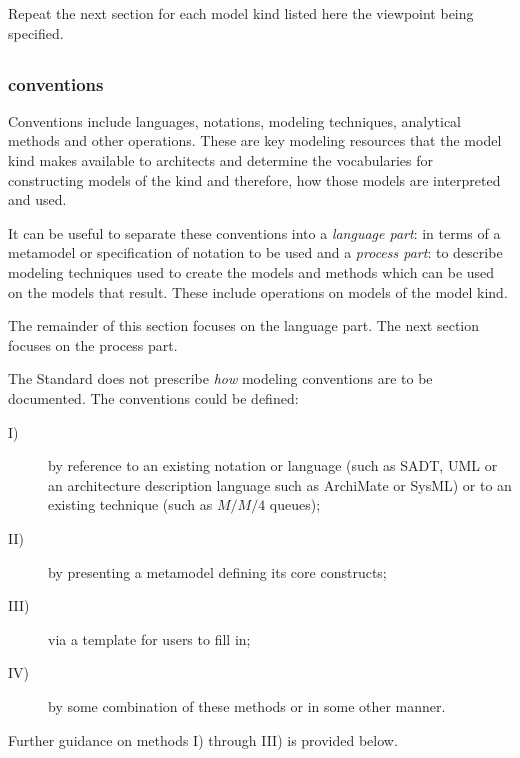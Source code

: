 Repeat the next section for each model kind listed here the viewpoint
being specified.


\subsection{}\label{vp:mk}



\subsubsection{ conventions} 


Conventions include languages, notations, modeling techniques,
analytical methods and other operations. These are key modeling
resources that the model kind makes available to architects and
determine the vocabularies for constructing models of the kind and
therefore, how those models are interpreted and used.

It can be useful to separate these conventions into a \emph{language
  part}: in terms of a metamodel or specification of notation to be
used and a \emph{process part}: to describe modeling techniques used
to create the models and methods which can be used on the models that
result.  These include operations on models of the model kind.

The remainder of this section focuses on the language part. The next
section focuses on the process part.

The Standard does not prescribe \emph{how} modeling conventions are to
be documented.  The conventions could be defined:
\begin{description}
\item[I)] by reference to an existing notation or language (such as
  SADT, UML or an architecture description language such as ArchiMate
  or SysML) or to an existing technique (such as $M/M/4$ queues);
\item[II)] by presenting a metamodel defining its core constructs;
\item[III)] via a template for users to fill in;
\item[IV)] by some combination of these methods or in some other
  manner.
\end{description}

Further guidance on methods I) through III) is provided below.
 
